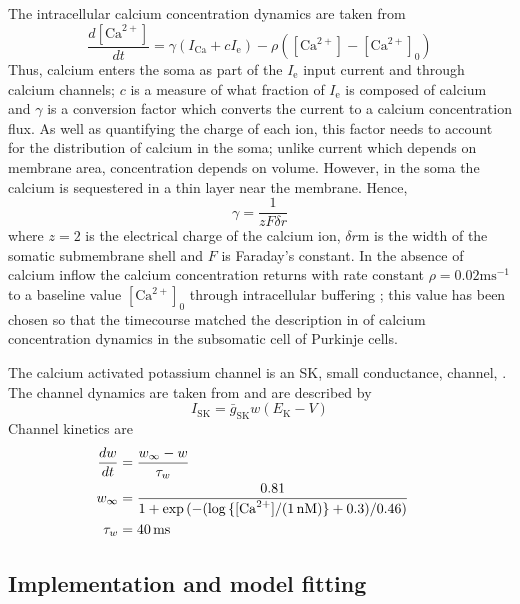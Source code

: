 \documentclass[twocolumn]{svjour3}          %
\newcommand{\mse}{\,\mathrm{ms}}
\renewcommand{\k}{\mathrm{K}}
\newcommand{\ca}{\mathrm{Ca}}
\newcommand{\sk}{\mathrm{SK}}
\begin{document}
The intracellular calcium concentration dynamics are taken from
\citet{SterrattEtAl2012,KochSegev1998}
\begin{equation}
\label{eq:ca_concentration}
\frac{d[\ca^{2+}]}{dt}=\gamma (I_\ca+cI_{\mathrm{e}})  -
\rho ([\ca^{2+}]-[\ca^{2+}]_0)
\end{equation}
Thus, calcium enters the soma as part of the $I_\mathrm{e}$ input
current and through calcium channels; $c$ is a measure of what
fraction of $I_{\mathrm{e}}$ is composed of calcium and $\gamma$ is a
conversion factor which converts the current to a calcium
concentration flux. As well as quantifying the charge of each ion,
this factor needs to account for the distribution of calcium in the
soma; unlike current which depends on membrane area, concentration
depends on volume. However, in the soma the calcium is sequestered in
a thin layer near the membrane. Hence,
\begin{equation}
\gamma=\frac{1}{zF\delta r} 
\end{equation}
where $z=2$ is the electrical charge of the
calcium ion, $\delta r$m is the width of the somatic
submembrane shell and $F$ is Faraday's constant. In the absence of
calcium inflow the calcium concentration returns with rate constant
$\rho=0.02\mathrm{ms}^{-1}$ to a baseline value $[\ca^{2+}]_0$ through intracellular buffering
\citep{KanoEtAl1995,FierroEtAl1998,AiraksinenEtAl1997}; this value has been chosen
so that the timecourse matched the description in
\citet{EilersEtAl1995} of calcium concentration dynamics in the
subsomatic cell of Purkinje cells.

The calcium activated potassium channel is an SK, small conductance,
channel, \citep{LancasterEtAl1991}. The channel dynamics are taken from
\citet{GilliesWillshaw2006} and are described by
\begin{equation}
\label{eq:I_SK}
I_{\sk} = {\bar{g}_{\sk}}w(E_\k-V)
\end{equation}
Channel kinetics are
\begin{align}
\label{eq:w_kinetics}
\frac{dw}{dt} &= \frac{w_\infty- w}{\tau_w}\cr
w_{\infty}   &= \frac{0.81}{1 + \exp{(-(\log{\{[\ca^{2+}]/(1\,\mathrm{nM})\}}+0.3)/0.46)}}\cr
\tau_w &= 40 \mse
\end{align}

\subsection{Implementation and model fitting}
\end{document}
